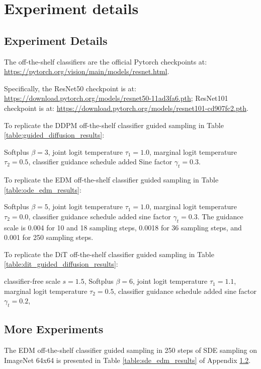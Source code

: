 \documentclass{article}
\theoremstyle{definition}
\begin{document}
\section{Experiment details}\label{appendix:experiment_details}


\subsection{Experiment Details}\label{appendix:parameter_settings}
The off-the-shelf classifiers are the official Pytorch checkpoints at: \url{https://pytorch.org/vision/main/models/resnet.html}. 

Specifically, the ResNet50 checkpoint is at:  
\url{https://download.pytorch.org/models/resnet50-11ad3fa6.pth}; ResNet101 checkpoint is at:
\url{https://download.pytorch.org/models/resnet101-cd907fc2.pth}.

To replicate the DDPM off-the-shelf classifier guided sampling in Table \ref{table:guided_diffusion_results}:

Softplus $\beta = 3$, joint logit temperature $\tau_1 = 1.0$, marginal logit temperature $\tau_2 = 0.5$, classifier guidance schedule added Sine factor $\gamma_t = 0.3$. 

To replicate the EDM off-the-shelf classifier guided sampling in Table \ref{table:ode_edm_results}:

Softplus $\beta = 5$, joint logit temperature $\tau_1 = 1.0$, marginal logit temperature $\tau_2 = 0.0$, classifier guidance schedule added sine factor $\gamma_t = 0.3$. The guidance scale is 0.004 for 10 and 18 sampling steps, 0.0018 for 36 sampling steps, and 0.001 for 250 sampling steps. 


To replicate the DiT off-the-shelf classifier guided sampling in Table \ref{table:dit_guided_diffusion_results}:

classifier-free scale $s=1.5$, Softplus $\beta = 6$, joint logit temperature $\tau_1 = 1.1$, marginal logit temperature $\tau_2 = 0.5$, classifier guidance schedule added sine factor $\gamma_t = 0.2$,


\subsection{More Experiments}\label{appendix:more_experiment}

The EDM off-the-shelf classifier guided sampling in 250 steps of SDE sampling on ImageNet 64x64 \cite{kingma2023variational} is presented in Table \ref{table:sde_edm_results} of Appendix \ref{appendix:more_experiment}. 
\end{document}
